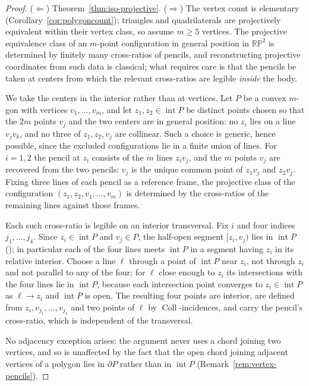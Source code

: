 \documentclass[11pt]{amsart}
\theoremstyle{definition}
\newcommand{\RP}{\mathbb{RP}}
\newcommand{\Coll}{\operatorname{Coll}}
\newcommand{\interior}{\operatorname{int}}
\begin{document}
\begin{proof}
($\Leftarrow$) Theorem~\ref{thm:iso-projective}. ($\Rightarrow$) The vertex
count is elementary (Corollary~\ref{cor:polygoncount}); triangles and
quadrilaterals are projectively equivalent within their vertex class, so
assume $m\ge5$ vertices. The projective equivalence class of an $m$-point
configuration in general position in $\RP^2$ is determined by finitely many
cross-ratios of pencils, and reconstructing projective coordinates from
such data is classical; what requires care is that the pencils be taken at
centers from which the relevant cross-ratios are legible \emph{inside} the
body.

We take the centers in the interior rather than at vertices. Let $P$ be a
convex $m$-gon with vertices $v_1,\dots,v_m$, and let $z_1,z_2\in\interior
P$ be distinct points chosen so that the $2m$ points $v_j$ and the two
centers are in general position: no $z_i$ lies on a line $v_jv_k$, and no
three of $z_1,z_2,v_j$ are collinear. Such a choice is generic, hence
possible, since the excluded configurations lie in a finite union of lines.
For $i=1,2$ the pencil at $z_i$ consists of the $m$ lines $z_iv_j$, and the
$m$ points $v_j$ are recovered from the two pencils: $v_j$ is the unique
common point of $z_1v_j$ and $z_2v_j$. Fixing three lines of each pencil as
a reference frame, the projective class of the configuration
$(z_1,z_2,v_1,\dots,v_m)$ is determined by the cross-ratios of the remaining
lines against those frames.

Each such cross-ratio is legible on an interior transversal. Fix $i$ and four
indices $j_1,\dots,j_4$. Since $z_i\in\interior P$ and $v_j\in P$, the
half-open segment $[z_i,v_j)$ lies in $\interior P$
(\cite[Lemma~1.1.9]{Schneider14}); in particular each of the four lines meets
$\interior P$ in a segment having $z_i$ in its relative interior. Choose a
line $\ell$ through a point of $\interior P$ near $z_i$, not through $z_i$ and
not parallel to any of the four; for $\ell$ close enough to $z_i$ its
intersections with the four lines lie in $\interior P$, because each
intersection point converges to $z_i\in\interior P$ as $\ell\to z_i$ and
$\interior P$ is open. The resulting four points are interior, are defined
from $z_i,v_{j_1},\dots,v_{j_4}$ and two points of $\ell$ by
$\Coll$-incidences, and carry the pencil's cross-ratio, which is independent
of the transversal.

No adjacency exception arises: the argument never uses a chord joining two
vertices, and so is unaffected by the fact that the open chord joining
adjacent vertices of a polygon lies in $\partial P$ rather than in
$\interior P$ (Remark~\ref{rem:vertex-pencils}).


\end{proof}
\end{document}
